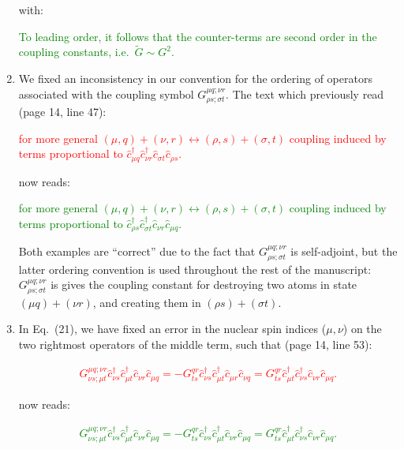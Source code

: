 \documentclass[preprint]{revtex4-1}
\newcommand{\p}[1]{\left(#1\right)} %
\renewcommand{\c}{\hat{c}}
\newcommand{\1}{\mathds{1}}
\newcommand{\red}[1]{\textcolor{red}{#1}}
\newcommand{\green}[1]{\textcolor{green}{#1}}
\begin{document}
\begin{enumerate}[label=(R3.\arabic*)]
  with:

  \green{To leading order, it follows that the counter-terms are
    second order in the coupling constants, i.e.~$\tilde G\sim G^2$.}


\item We fixed an inconsistency in our convention for the ordering of
  operators associated with the coupling symbol
  $G^{\mu q;\nu r}_{\rho s;\sigma t}$.  The text which previously read
  (page 14, line 47):

  \red{for more general
    $\p{\mu,q}+\p{\nu,r}\leftrightarrow\p{\rho,s}+\p{\sigma,t}$
    coupling induced by terms proportional to
    $\c_{\mu q}^\dag \c_{\nu r}^\dag \c_{\sigma t} \c_{\rho s}$.}

  now reads:

  \green{for more general
    $\p{\mu,q}+\p{\nu,r}\leftrightarrow\p{\rho,s}+\p{\sigma,t}$
    coupling induced by terms proportional to
    $\c_{\rho s}^\dag \c_{\sigma t}^\dag \c_{\nu r} \c_{\mu q}$.}

  Both examples are ``correct'' due to the fact that
  $G^{\mu q;\nu r}_{\rho s;\sigma t}$ is self-adjoint, but the latter
  ordering convention is used throughout the rest of the manuscript:
  $G^{\mu q;\nu r}_{\rho s;\sigma t}$ is gives the coupling constant
  for destroying two atoms in state $\p{\mu q}+\p{\nu r}$, and
  creating them in $\p{\rho s}+\p{\sigma t}$.


\item In Eq.~(21), we have fixed an error in the nuclear spin indices
  ($\mu,\nu$) on the two rightmost operators of the middle term, such
  that (page 14, line 53):

  \red{\begin{align*}
      G^{\mu q;\nu r}_{\nu s;\mu t}
      \c_{\nu s}^\dag \c_{\mu t}^\dag \c_{\nu r} \c_{\mu q}
      = -G^{qr}_{ts} \c_{\nu s}^\dag \c_{\mu t}^\dag \c_{\mu r} \c_{\nu q}
      = G^{qr}_{ts} \c_{\mu t}^\dag \c_{\nu s}^\dag \c_{\nu r} \c_{\mu q}.
      \tag{21}
    \end{align*}}

  now reads:

  \green{\begin{align*}
      G^{\mu q;\nu r}_{\nu s;\mu t}
      \c_{\nu s}^\dag \c_{\mu t}^\dag \c_{\nu r} \c_{\mu q}
      = -G^{qr}_{ts} \c_{\nu s}^\dag \c_{\mu t}^\dag \c_{\nu r} \c_{\mu q}
      = G^{qr}_{ts} \c_{\mu t}^\dag \c_{\nu s}^\dag \c_{\nu r} \c_{\mu q}.
      \tag{21}
    \end{align*}}



\end{enumerate}
\end{document}
